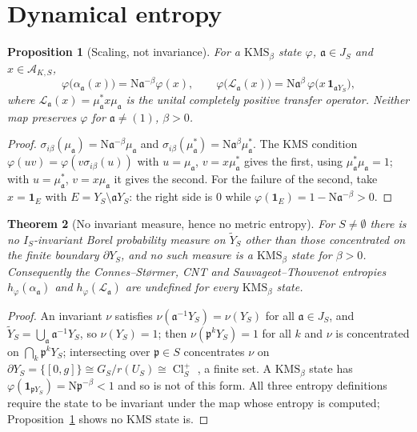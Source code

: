 \documentclass[11pt]{amsart}
\numberwithin{equation}{section}
\newtheorem{theorem}{Theorem}[section]
\newtheorem{proposition}[theorem]{Proposition}
\theoremstyle{definition}
\theoremstyle{remark}
\newcommand{\cA}{\mathcal{A}}
\newcommand{\cL}{\mathcal{L}}
\newcommand{\pp}{\mathfrak{p}}
\newcommand{\aaa}{\mathfrak{a}}
\newcommand{\Ns}{\mathrm{N}}
\newcommand{\Cl}{\operatorname{Cl}}
\begin{document}
\section{Dynamical entropy}\label{sec:entropy}

\begin{proposition}[Scaling, not invariance]\label{prop:scaling}
For a $\mathrm{KMS}_\beta$ state $\varphi$, $\aaa\in J_S$ and $x\in\cA_{K,S}$,
\[
\varphi\bigl(\alpha_\aaa(x)\bigr)=\Ns\aaa^{-\beta}\varphi(x),
\qquad
\varphi\bigl(\cL_\aaa(x)\bigr)=\Ns\aaa^{\beta}\,\varphi\bigl(x\,\mathbf 1_{\aaa Y_S}\bigr),
\]
where $\cL_\aaa(x)=\mu_\aaa^*x\mu_\aaa$ is the unital completely positive transfer operator.
Neither map preserves $\varphi$ for $\aaa\ne(1)$, $\beta>0$.
\end{proposition}

\begin{proof}
$\sigma_{i\beta}(\mu_\aaa)=\Ns\aaa^{-\beta}\mu_\aaa$ and
$\sigma_{i\beta}(\mu_\aaa^*)=\Ns\aaa^{\beta}\mu_\aaa^*$. The KMS condition
$\varphi(uv)=\varphi(v\sigma_{i\beta}(u))$ with $u=\mu_\aaa$, $v=x\mu_\aaa^*$ gives the
first, using $\mu_\aaa^*\mu_\aaa=1$; with $u=\mu_\aaa^*$, $v=x\mu_\aaa$ it gives the second.
For the failure of the second, take $x=\mathbf 1_E$ with $E=Y_S\setminus\aaa Y_S$: the right
side is $0$ while $\varphi(\mathbf 1_E)=1-\Ns\aaa^{-\beta}>0$.
\end{proof}

\begin{theorem}[No invariant measure, hence no metric entropy]\label{thm:noinv}
For $S\ne\emptyset$ there is no $I_S$-invariant Borel probability measure on
$\widetilde Y_S$ other than those concentrated on the finite boundary $\partial Y_S$, and no
such measure is a $\mathrm{KMS}_\beta$ state for $\beta>0$. Consequently the
Connes--St\o rmer, CNT and Sauvageot--Thouvenot entropies \cite{CS,CNT,ST}
$h_\varphi(\alpha_\aaa)$ and $h_\varphi(\cL_\aaa)$ are undefined for every
$\mathrm{KMS}_\beta$ state.
\end{theorem}

\begin{proof}
An invariant $\nu$ satisfies $\nu(\aaa^{-1}Y_S)=\nu(Y_S)$ for all $\aaa\in J_S$, and
$\widetilde Y_S=\bigcup_\aaa\aaa^{-1}Y_S$, so $\nu(Y_S)=1$; then $\nu(\pp^kY_S)=1$ for all $k$
and $\nu$ is concentrated on $\bigcap_k\pp^kY_S$; intersecting over $\pp\in S$ concentrates
$\nu$ on $\partial Y_S=\{[0,g]\}\cong G_S/r(U_S)\cong\Cl^+_S$ \cite[(2.1)]{Main}, a finite
set. A
$\mathrm{KMS}_\beta$ state has $\varphi(\mathbf 1_{\pp Y_S})=\Ns\pp^{-\beta}<1$ and so is not
of this form. All three entropy definitions require the state to be invariant under the map
whose entropy is computed; Proposition~\ref{prop:scaling} shows no KMS state is.
\end{proof}
\end{document}
